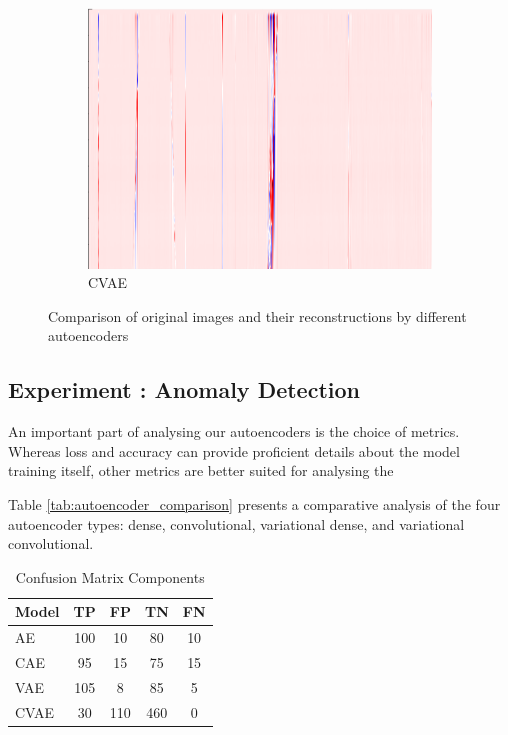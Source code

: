 \begin{figure}[!h]
\begin{subfigure}{0.33\textwidth}
        \includegraphics[width=\textwidth]{figures/test.png}
        \caption{CVAE}
    \end{subfigure}
    
    \caption{Comparison of original images and their reconstructions by different autoencoders}
    \label{fig:aereconstruct}
\end{figure}

\subsection{Experiment : Anomaly Detection}

An important part of analysing our autoencoders is the choice of metrics. Whereas loss and accuracy can provide proficient details about the model training itself, other metrics are better suited for analysing the 

Table \ref{tab:autoencoder_comparison} presents a comparative analysis of the four autoencoder types: dense, convolutional, variational dense, and variational convolutional.





\begin{table}[!htbp]
\centering
\label{tab:confusion-matrix-results}
\begin{tabular}{l
    S[table-format=3.0]
    S[table-format=3.0]
    S[table-format=3.0]
    S[table-format=3.0]
}
\toprule
\textbf{Model} & {\textbf{TP}} & {\textbf{FP}} & {\textbf{TN}} & {\textbf{FN}} \\
\midrule
{} AE   & 100 & 10 & 80 & 10 \\
CAE  & 95 & 15 & 75 & 15 \\
 VAE  & 105 & 8 & 85 & 5 \\
CVAE & 30 & 110 & 460 & 0 \\
\bottomrule
\end{tabular}
\caption{Confusion Matrix Components}
\end{table}

